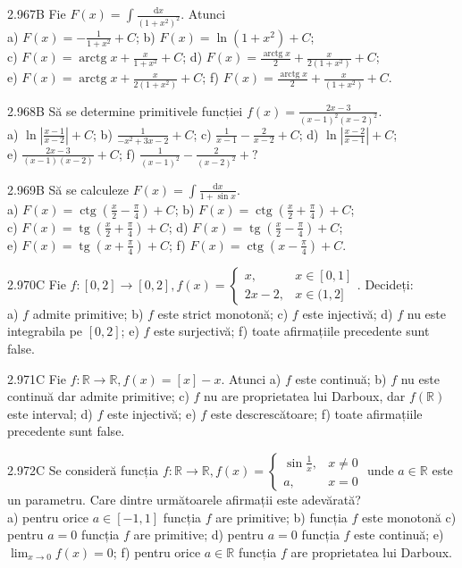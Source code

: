 \documentclass[11pt]{article}
\begin{document}
2.967B Fie $F(x)=\int \frac{\mathrm{d} x}{\left(1+x^{2}\right)^{2}}$. Atunci\\ a) $F(x)=-\frac{1}{1+x^{2}}+C$; b) $F(x)=\ln \left(1+x^{2}\right)+C$;\\ c) $F(x)=\operatorname{arctg} x+\frac{x}{1+x^{2}}+C$; d)  $F(x)=\frac{\operatorname{arctg} x}{2}+\frac{x}{2\left(1+x^{2}\right)}+C$;\\ e) $F(x)=\operatorname{arctg} x+\frac{x}{2\left(1+x^{2}\right)}+C$; f) $F(x)=\frac{\operatorname{arctg} x}{2}+\frac{x}{\left(1+x^{2}\right)}+C$.

2.968B Să se determine primitivele funcției $f(x)=\frac{2 x-3}{(x-1)^{2}(x-2)^{2}}$.\\ a) $\ln \left|\frac{x-1}{x-2}\right|+C$; b) $\frac{1}{-x^{2}+3 x-2}+C$; c) $\frac{1}{x-1}-\frac{2}{x-2}+C$; d) $\ln \left|\frac{x-2}{x-1}\right|+C$;\\ e) $\frac{2 x-3}{(x-1)(x-2)}+C$; f) $\frac{1}{(x-1)^{2}}-\frac{2}{(x-2)^{2}}+?$

2.969B Să se calculeze $F(x)=\int \frac{\mathrm{d} x}{1+\sin x}$.\\ a) $F(x)=\operatorname{ctg}\left(\frac{x}{2}-\frac{\pi}{4}\right)+C$; b) $F(x)=\operatorname{ctg}\left(\frac{x}{2}+\frac{\pi}{4}\right)+C$;\\ c) $F(x)=\operatorname{tg}\left(\frac{x}{2}+\frac{\pi}{4}\right)+C$; d) $F(x)=\operatorname{tg}\left(\frac{x}{2}-\frac{\pi}{4}\right)+C$;\\ e) $F(x)=\operatorname{tg}\left(x+\frac{\pi}{4}\right)+C$; f) $F(x)=\operatorname{ctg}\left(x-\frac{\pi}{4}\right)+C$.

2.970C Fie $f:[0,2] \rightarrow[0,2], f(x)=\left\{\begin{array}{ll}x, & x \in[0,1] \\ 2 x-2, & x \in(1,2]\end{array}\right.$. Decideți:\\ a) $f$ admite primitive; b) $f$ este strict monotonă; c) $f$ este injectivă; d) $f$ nu este integrabila pe $[0,2]$; e) $f$ este surjectivă; f) toate afirmațiile precedente sunt false.

2.971C Fie $f: \mathbb{R} \rightarrow \mathbb{R}, f(x)=[x]-x$. Atunci a) $f$ este continuă; b) $f$ nu este continuă dar admite primitive; c) $f$ nu are proprietatea lui Darboux, dar $f(\mathbb{R})$ este interval; d) $f$ este injectivă; e) $f$ este descrescătoare; f) toate afirmațiile precedente sunt false.

2.972C Se consideră funcția $f:\mathbb{R} \rightarrow \mathbb{R}, f(x)=\left\{\begin{array}{ll}\sin\frac{1}{x}, & x \neq 0 \\ a, & x=0\end{array}\right.$ unde $a \in \mathbb{R}$ este un parametru. Care dintre următoarele afirmații este adevărată?\\ a) pentru orice $a \in[-1,1]$ funcția $f$ are primitive; b) funcția $f$ este monotonă c) pentru $a=0$ funcția $f$ are primitive; d) pentru $a=0$ funcția $f$ este continuă; e) $\lim _{x \rightarrow 0} f(x)=0$; f) pentru orice $a \in \mathbb{R}$ funcția $f$ are proprietatea lui Darboux.
\end{document}
